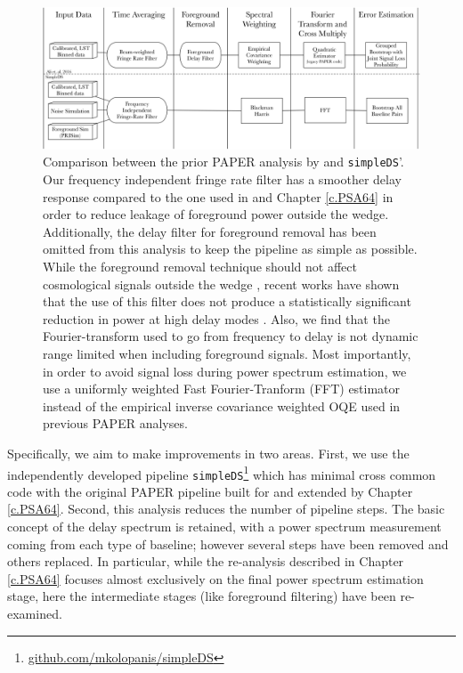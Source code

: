 \begin{figure}[tp]
\begin{center}
\includegraphics[width=\textwidth]{plots/simpleDS_pipeline_compare.jpg}
\caption{Comparison between the prior PAPER analysis by \citet{ali_et_al2015} and \texttt{simpleDS}'.
Our frequency independent fringe rate filter has a smoother
delay response compared to the one used in
\citet{ali_et_al2015} and
Chapter \ref{c.PSA64} in order to reduce leakage
of foreground power outside the wedge.
Additionally, the delay filter for foreground removal has been
omitted from this analysis to keep the pipeline
as simple as possible. While the foreground removal
technique should not affect cosmological
signals outside the wedge
\citep{parsons_backer2009, parsons_et_al2012b, parsons_et_al2014},
recent works have shown that the use of this filter does
not produce a statistically significant reduction
in power at high delay modes \citep{kerrigan_et_al2018}.
Also, we find that the Fourier-transform used to go from
frequency to delay is not dynamic range limited
when including foreground signals.
Most importantly, in order to avoid signal loss during power spectrum
estimation, we use a uniformly weighted
Fast Fourier-Tranform (FFT) estimator instead of the
empirical inverse covariance weighted OQE used in
previous PAPER analyses.}
\label{fig:pipeline_compare}
\end{center}
\end{figure}

Specifically, we aim to make improvements in two areas. First, we use the
independently developed pipeline \texttt{simpleDS}\footnote{\url{github.com/mkolopanis/simpleDS}} which has minimal cross common code with the original PAPER pipeline built for  and
extended by Chapter \ref{c.PSA64}.
 Second, this analysis reduces the number of pipeline steps.  The basic concept of the delay spectrum
is retained, with a power spectrum measurement coming from each type of baseline; however several steps have been removed and others replaced. In particular, while the re-analysis described in Chapter \ref{c.PSA64} focuses almost exclusively on
the final power spectrum estimation stage, here the intermediate stages (like foreground filtering) have been re-examined.

